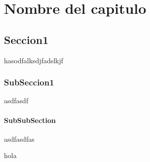 \chapter {Nombre del capitulo}

\section{Seccion1}
hasodfalksdjfadslkjf
\subsection{SubSeccion1}
asdfasdf
\subsubsection{SubSubSection}
asdfasdfas

\cite{BibTeXen2:online}hola




